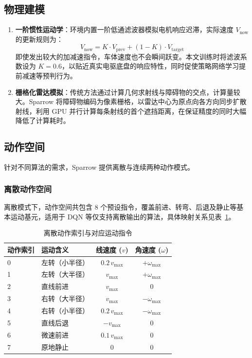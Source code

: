 \subsection{物理建模}

\begin{enumerate}
    \item \textbf{一阶惯性运动学}：环境内置一阶低通滤波器模拟电机响应迟滞，实际速度 $V_{\text{now}}$ 的更新规则为：
    \begin{equation}
        V_{\text{now}} = K \cdot V_{\text{prev}} + (1-K) \cdot V_{\text{target}}
    \end{equation}
    即使发出较大的加减速指令，车体速度也不会瞬间跃变。本文训练时将滤波系数设为 $K=0.6$，以贴近真实电驱底盘的响应特性，同时促使策略网络学习提前减速等预判行为。
    \item \textbf{栅格化雷达模拟}：传统方法通过计算几何求射线与障碍物的交点，计算量较大。Sparrow 将障碍物编码为像素栅格，以雷达中心为原点向各方向同步扩散射线，利用 GPU 并行计算每条射线的首个遮挡距离，在保证精度的同时大幅降低了计算耗时。
\end{enumerate}

\subsection{动作空间}

针对不同算法的需求，Sparrow 提供离散与连续两种动作模式。

\subsubsection{离散动作空间}

离散模式下，动作空间共包含 8 个预设指令，覆盖前进、转弯、后退及静止等基本运动基元，适用于 DQN 等仅支持离散输出的算法，具体映射关系见表~\ref{tab:discrete_action}。

\begin{table}[H]
    \centering
    \caption{离散动作索引与对应运动指令}
    \label{tab:discrete_action}
    \begin{tabular}{llcc}
        \toprule
        \textbf{动作索引} & \textbf{运动含义} & \textbf{线速度 ($v$)} & \textbf{角速度 ($\omega$)} \\
        \midrule
        0 & 左转（小半径） & $0.2\,v_{\max}$ & $+\omega_{\max}$ \\
        1 & 左转（大半径） & $v_{\max}$ & $+\omega_{\max}$ \\
        2 & 直线前进 & $v_{\max}$ & $0$ \\
        3 & 右转（大半径） & $v_{\max}$ & $-\omega_{\max}$ \\
        4 & 右转（小半径） & $0.2\,v_{\max}$ & $-\omega_{\max}$ \\
        5 & 直线后退 & $-v_{\max}$ & $0$ \\
        6 & 微速前进 & $0.1\,v_{\max}$ & $0$ \\
        7 & 原地静止 & $0$ & $0$ \\
        \bottomrule
    \end{tabular}
\end{table}

